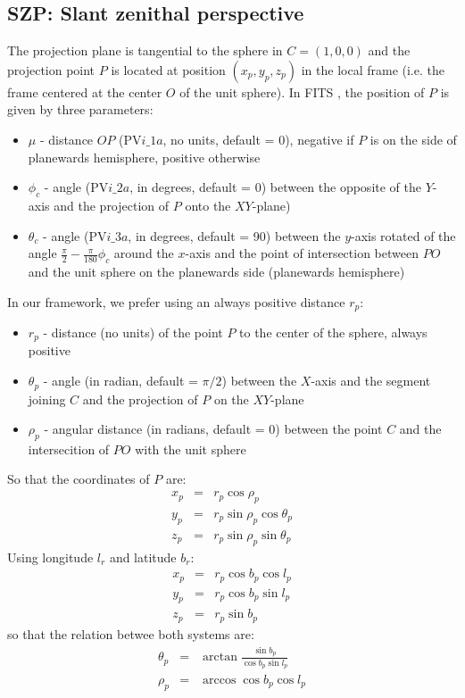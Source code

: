 \subsection{SZP: Slant zenithal perspective \label{sec:szp}}

  The projection plane is tangential to the sphere in $C=(1, 0, 0)$ and the 
  projection point $P$ is located at position $(x_p, y_p, z_p)$ in the local frame
  (i.e. the frame centered at the center $O$ of the unit sphere).
  In FITS \citep[see][\S 5.1.2]{Calabretta2002}, the position of $P$ is given by three parameters:
  \begin{itemize}
    \item $\mu$ - distance $OP$ (PV$i\_1a$, no units, default = 0), negative if $P$ is on the side of planewards hemisphere, positive otherwise
    \item $\phi_c$   - angle (PV$i\_2a$, in degrees, default = 0) between the opposite of the $Y$-axis and the projection of $P$ onto the $XY$-plane)
    \item $\theta_c$ - angle (PV$i\_3a$, in degrees, default = 90) between the $y$-axis rotated of the angle $\frac{\pi}{2} - \frac{\pi}{180}\phi_c$ around the $x$-axis
                       and the point of intersection between $PO$ and the unit sphere on the planewards side (planewards hemisphere)
  \end{itemize}
  In our framework, we prefer using an always positive distance $r_p$:
  \begin{itemize}
    \item $r_p$ - distance (no units) of the point $P$ to the center of the sphere, always positive
    \item $\theta_p$ - angle (in radian, default =  $\pi/2$) between the $X$-axis and the segment joining $C$ and the projection of $P$ on the $XY$-plane
    \item $\rho_p$   - angular distance (in radians, default = 0) between the point $C$ and the intersecition of $PO$ with the unit sphere
  \end{itemize}
  So that the coordinates of $P$ are:
  \begin{eqnarray}
     x_p & = & r_p \cos\rho_p \\
     y_p & = & r_p \sin\rho_p \cos\theta_p\\
     z_p & = & r_p \sin\rho_p \sin\theta_p
  \end{eqnarray}
  Using longitude $l_r$ and latitude $b_r$:
  \begin{eqnarray}
     x_p & = & r_p \cos b_p \cos l_p \\
     y_p & = & r_p \cos b_p \sin l_p\\
     z_p & = & r_p \sin b_p
  \end{eqnarray}
  so that the relation betwee both systems are:
  \begin{eqnarray}
    \theta_p & = & \arctan{ \frac{\sin b_p}{\cos b_p \sin l_p} } \\
    \rho_p & = & \arccos{ \cos b_p \cos l_p }
  \end{eqnarray}

